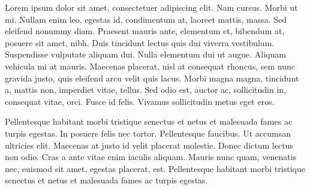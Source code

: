 \documentclass[11pt]{amsart}
\begin{document}
Lorem ipsum dolor sit amet, consectetuer adipiscing elit. Nam cursus. Morbi ut mi. Nullam enim leo, egestas id, condimentum at, laoreet mattis, massa. Sed eleifend nonummy diam. Praesent mauris ante, elementum et, bibendum at, posuere sit amet, nibh. Duis tincidunt lectus quis dui viverra vestibulum. Suspendisse vulputate aliquam dui. Nulla elementum dui ut augue. Aliquam vehicula mi at mauris. Maecenas placerat, nisl at consequat rhoncus, sem nunc gravida justo, quis eleifend arcu velit quis lacus. Morbi magna magna, tincidunt a, mattis non, imperdiet vitae, tellus. Sed odio est, auctor ac, sollicitudin in, consequat vitae, orci. Fusce id felis. Vivamus sollicitudin metus eget eros.

Pellentesque habitant morbi tristique senectus et netus et malesuada fames ac turpis egestas. In posuere felis nec tortor. Pellentesque faucibus. Ut accumsan ultricies elit. Maecenas at justo id velit placerat molestie. Donec dictum lectus non odio. Cras a ante vitae enim iaculis aliquam. Mauris nunc quam, venenatis nec, euismod sit amet, egestas placerat, est. Pellentesque habitant morbi tristique senectus et netus et malesuada fames ac turpis egestas.
\end{document}
